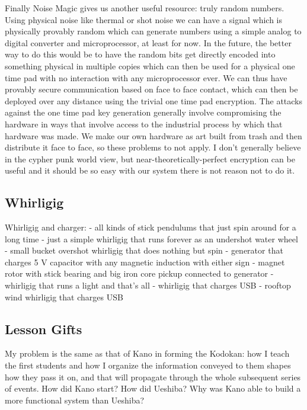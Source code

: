 Finally Noise Magic gives us another useful resource: truly random
numbers. Using physical noise like thermal or shot noise we can have a
signal which is physically provably random which can generate numbers
using a simple analog to digital converter and microprocessor, at least
for now. In the future, the better way to do this would be to have the
random bits get directly encoded into something physical in multiple
copies which can then be used for a physical one time pad with no
interaction with any microprocessor ever. We can thus have provably
secure communication based on face to face contact, which can then be
deployed over any distance using the trivial one time pad encryption.
The attacks against the one time pad key generation generally involve
compromising the hardware in ways that involve access to the industrial
process by which that hardware was made. We make our own hardware as art
built from trash and then distribute it face to face, so these problems
to not apply. I don't generally believe in the cypher punk world view,
but near-theoretically-perfect encryption can be useful and it should be
so easy with our system there is not reason not to do it.

\subsection{Whirligig}\label{whirligig}

Whirligig and charger: - all kinds of stick pendulums that just spin
around for a long time - just a simple whirligig that runs forever as an
undershot water wheel - small bucket overshot whirligig that does
nothing but spin - generator that charges 5 V capacitor with any
magnetic induction with either sign - magnet rotor with stick bearing
and big iron core pickup connected to generator - whirligig that runs a
light and that's all - whirligig that charges USB - rooftop wind
whirligig that charges USB

\subsection{Lesson Gifts}\label{lesson-gifts}

My problem is the same as that of Kano in forming the Kodokan: how I
teach the first students and how I organize the information conveyed to
them shapes how they pass it on, and that will propagate through the
whole subsequent series of events. How did Kano start? How did Ueshiba?
Why was Kano able to build a more functional system than Ueshiba?

